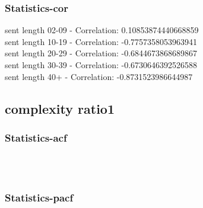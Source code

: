 \documentclass{article}%
\begin{document}
%
\newpage%
\subsubsection{Statistics{-}cor}%
\label{ssubsec:Statistics{-}cor}%
\noindent%
sent length 02-09 - Correlation: 0.10853874440668859\\%
sent length 10-19 - Correlation: -0.7757358053963941\\%
sent length 20-29 - Correlation: -0.6844673868689867\\%
sent length 30-39 - Correlation: -0.6730646392526588\\%
sent length 40+ - Correlation: -0.8731523986644987\\

%
\newpage

%
\subsection{complexity ratio1}%
\label{subsec:complexityratio1}%
\subsubsection{Statistics{-}acf}%
\label{ssubsec:Statistics{-}acf}%


\begin{figure}[ht]%
\centering%
\setlength{\abovecaptionskip}{-35pt}%
%
%
\\%
%
%
\\%
%
\end{figure}

%
\newpage%
\subsubsection{Statistics{-}pacf}%
\label{ssubsec:Statistics{-}pacf}%
\end{document}
